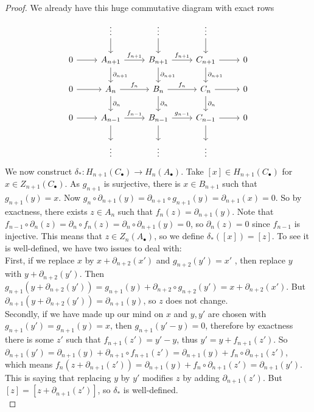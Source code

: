 \begin{proof}
    We already have this huge commutative diagram with exact rows
    \[
        \begin{tikzcd}
            &\vdots\arrow{d}&\vdots\arrow{d}&\vdots\arrow{d}&\\
            0\arrow{r}&A_{n+1}\arrow{r}{f_{n+1}}\arrow{d}{\partial_{n+1}}&B_{n+1}\arrow{r}{f_{n+1}}\arrow{d}{\partial_{n+1}}&C_{n+1}\arrow{r}\arrow{d}{\partial_{n+1}}&0\\
            0\arrow{r}&A_n\arrow{r}{f_n}\arrow{d}{\partial_n}&B_n\arrow{r}{f_n}\arrow{d}{\partial_n}&C_n\arrow{r}\arrow{d}{\partial_n}&0\\
            0\arrow{r}&A_{n-1}\arrow{r}{f_{n-1}}\arrow{d}&B_{n-1}\arrow{r}{g_{n-1}}\arrow{d}&C_{n-1}\arrow{r}\arrow{d}&0\\
            &\vdots&\vdots&\vdots&
        \end{tikzcd}
    \]
    We now construct $\delta_\ast:H_{n+1}(C_\bullet)\to H_n(A_\bullet)$.
    Take $[x]\in H_{n+1}(C_\bullet)$ for $x\in Z_{n+1}(C_\bullet)$.
    As $g_{n+1}$ is surjective, there is $x\in B_{n+1}$ such that $g_{n+1}(y)=x$.
    Now $g_n\circ\partial_{n+1}(y)=\partial_{n+1}\circ g_{n+1}(y)=\partial_{n+1}(x)=0$.
    So by exactness, there exists $z\in A_n$ such that $f_n(z)=\partial_{n+1}(y)$.
    Note that $f_{n-1}\circ\partial_n(z)=\partial_n\circ f_n(z)=\partial_n\circ\partial_{n+1}(y)=0$, so $\partial_n(z)=0$ since $f_{n-1}$ is injective.
    This means that $z\in Z_n(A_\bullet)$, so we define $\delta_\ast([x])=[z]$.
    To see it is well-defined, we have two issues to deal with:\\
    First, if we replace $x$ by $x+\partial_{n+2}(x')$ and $g_{n+2}(y')=x'$ , then replace $y$ with $y+\partial_{n+2}(y')$.
    Then $g_{n+1}(y+\partial_{n+2}(y'))=g_{n+1}(y)+\partial_{n+2}\circ g_{n+2}(y')=x+\partial_{n+2}(x')$.
    But $\partial_{n+1}(y+\partial_{n+2}(y'))=\partial_{n+1}(y)$, so $z$ does not change.\\
    Secondly, if we have made up our mind on $x$ and $y,y'$ are chosen with $g_{n+1}(y')=g_{n+1}(y)=x$, then $g_{n+1}(y'-y)=0$, therefore by exactness there is some $z'$ such that $f_{n+1}(z')=y'-y$, thus $y'=y+f_{n+1}(z')$.
    So $\partial_{n+1}(y')=\partial_{n+1}(y)+\partial_{n+1}\circ f_{n+1}(z')=\partial_{n+1}(y)+f_n\circ\partial_{n+1}(z')$, which means $f_n(z+\partial_{n+1}(z'))=\partial_{n+1}(y)+f_n\circ\partial_{n+1}(z')=\partial_{n+1}(y')$.
    This is saying that replacing $y$ by $y'$ modifies $z$ by adding $\partial_{n+1}(z')$.
    But $[z]=[z+\partial_{n+1}(z')]$, so $\delta_\ast$ is well-defined.\\

\end{proof}
